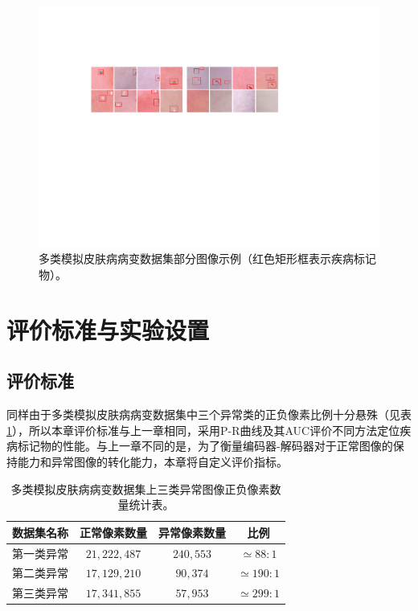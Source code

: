 \begin{figure}[h]
	\centering
	\includegraphics[width=1.0\textwidth]{figure/multi_classes_simulated_skin.pdf}
	\caption[多类模拟皮肤病病变数据集部分图像示例]{多类模拟皮肤病病变数据集部分图像示例（红色矩形框表示疾病标记物）。}
	\label{fig:mul_classes_simulated_ds}
\end{figure}
\vspace{-0.7cm}
\section{评价标准与实验设置}
\subsection{评价标准}
同样由于多类模拟皮肤病病变数据集中三个异常类的正负像素比例十分悬殊（见表\ref{tab:multi_ds_pixel_freqs}），所以本章评价标准与上一章相同，采用P-R曲线及其AUC评价不同方法定位疾病标记物的性能。与上一章不同的是，为了衡量编码器-解码器对于正常图像的保持能力和异常图像的转化能力，本章将自定义评价指标。
\begin{table}[h]
	\centering
	\caption[多类模拟皮肤病病变数据集上三类异常图像正负像素数量统计表]{多类模拟皮肤病病变数据集上三类异常图像正负像素数量统计表。}
	\label{tab:multi_ds_pixel_freqs}
	\begin{tabular}{c|c|c|c}
		\toprule[2pt]
		数据集名称 & 正常像素数量 & 异常像素数量 & 比例 \\
		\midrule[2pt]
		第一类异常&  $21,222,487$ & $240,553$ & $\simeq 88: 1$ \\ \hline
		第二类异常&  $17,129,210$ & $90,374$ & $\simeq 190: 1$ \\ \hline
		第三类异常 & $17,341,855$ & $57,953$ & $\simeq 299: 1$ \\
		\bottomrule[2pt]
	\end{tabular}
\end{table}
\vspace{-0.7cm}
